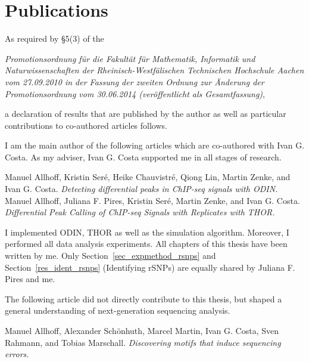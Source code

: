 \chapter*{Publications}
As required by \S 5(3) of the 
\\

\begin{addmargin}{0.07\textwidth}
\textit{Promotionsordnung für die Fakultät für Mathematik, Informatik und Naturwissenschaften der Rheinisch-Westfälischen Technischen Hochschule Aachen vom 27.09.2010 in der Fassung der zweiten Ordnung zur Änderung der Promotionsordnung vom 30.06.2014 (veröffentlicht als Gesamtfassung)},
\end{addmargin} 
\vspace{0.5cm}

\noindent
a declaration of results that are published by the author as well as particular contributions to co-authored articles follows.

I am the main author of the following articles which are co-authored with Ivan G. Costa. 
As my adviser, Ivan G. Costa supported me in all stages of research.
\\

\begin{addmargin}{0.07\textwidth}
Manuel Allhoff, Kristin Seré, Heike Chauvistré, Qiong Lin, Martin Zenke, and Ivan G. Costa.
\textit{Detecting differential peaks in ChIP-seq signals with ODIN.}
\\

\noindent
Manuel Allhoff, Juliana F. Pires, Kristin Seré, Martin Zenke, and Ivan G. Costa.
\textit{Differential Peak Calling of ChIP-seq Signals with Replicates with THOR.}
\end{addmargin} 
\vspace{0.5cm}

\noindent
I implemented ODIN, THOR as well as the simulation algorithm.
Moreover, I performed all data analysis experiments.
All chapters of this thesis have been written by me.
Only Section~\ref{sec_expmethod_rsnps} and Section~\ref{res_ident_rsnps} (Identifying rSNPs) are equally shared by Juliana F. Pires and me.

The following article did not directly contribute to this thesis, but shaped a general understanding of next-generation sequencing analysis.
\\

\begin{addmargin}{0.07\textwidth}
Manuel Allhoff, Alexander Sch\"onhuth, Marcel Martin, Ivan G. Costa, Sven Rahmann, and Tobias Marschall. 
\textit{Discovering motifs that induce sequencing errors.}
\end{addmargin} 
